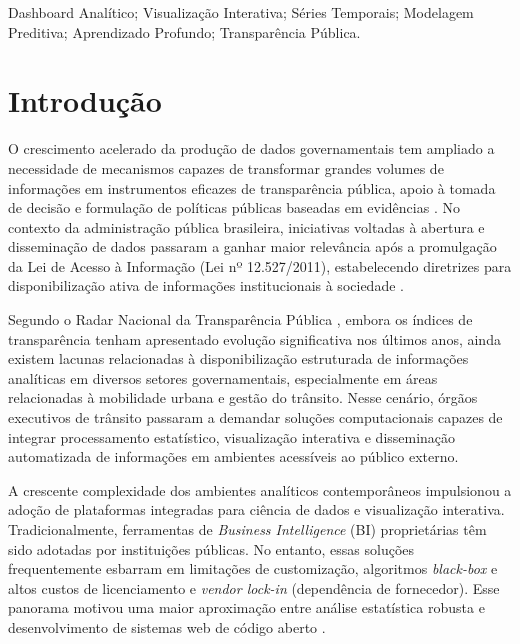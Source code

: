 \documentclass[10pt,conference]{IEEEtran}
\begin{document}
\renewcommand\IEEEkeywordsname{Palavras-chave}
\begin{IEEEkeywords}
Dashboard Analítico; Visualização Interativa; Séries Temporais; Modelagem Preditiva; Aprendizado Profundo; Transparência Pública.
\end{IEEEkeywords}

\IEEEpeerreviewmaketitle


\section{Introdução}

O crescimento acelerado da produção de dados governamentais tem ampliado a necessidade de mecanismos capazes de transformar grandes volumes de informações em instrumentos eficazes de transparência pública, apoio à tomada de decisão e formulação de políticas públicas baseadas em evidências \cite{janssen2012}. No contexto da administração pública brasileira, iniciativas voltadas à abertura e disseminação de dados passaram a ganhar maior relevância após a promulgação da Lei de Acesso à Informação (Lei nº 12.527/2011), estabelecendo diretrizes para disponibilização ativa de informações institucionais à sociedade \cite{brasil2011}.


Segundo o Radar Nacional da Transparência Pública \cite{atricon2025}, embora os índices de transparência tenham apresentado evolução significativa nos últimos anos, ainda existem lacunas relacionadas à disponibilização estruturada de informações analíticas em diversos setores governamentais, especialmente em áreas relacionadas à mobilidade urbana e gestão do trânsito. Nesse cenário, órgãos executivos de trânsito passaram a demandar soluções computacionais capazes de integrar processamento estatístico, visualização interativa e disseminação automatizada de informações em ambientes acessíveis ao público externo.

A crescente complexidade dos ambientes analíticos contemporâneos impulsionou a adoção de plataformas integradas para ciência de dados e visualização interativa. Tradicionalmente, ferramentas de \textit{Business Intelligence }(BI) proprietárias têm sido adotadas por instituições públicas. No entanto, essas soluções frequentemente esbarram em limitações de customização, algoritmos \textit{black-box} e altos custos de licenciamento e \textit{vendor lock-in} (dependência de fornecedor). Esse panorama motivou uma maior aproximação entre análise estatística robusta e desenvolvimento de sistemas web de código aberto \cite{wickham2017}. 
\end{document}
